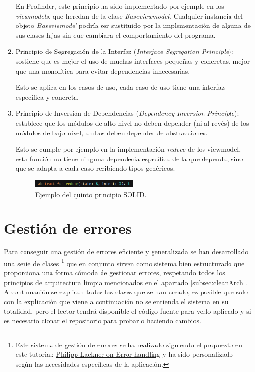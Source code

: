 \begin{enumerate}
    En Profinder, este principio ha sido implementado por ejemplo en los \textit{viewmodels}, que heredan de la clase \textit{Baseviewmodel}. Cualquier instancia del objeto \textit{Baseviemodel} podría ser sustituido por la implementación de alguna de sus clases hijas sin que cambiara el comportamiento del programa.
    \item Principio de Segregación de la Interfaz (\textit{Interface Segregation Principle}):  sostiene que es mejor el uso de muchas interfaces pequeñas y concretas, mejor que una monolítica para evitar dependencias innecesarias.
    
    Esto se aplica en los casos de uso, cada caso de uso tiene una interfaz específica y concreta.
    \item Principio de Inversión de Dependencias (\textit{Dependency Inversion Principle}): establece que los módulos de alto nivel no deben depender (ni al revés) de los módulos de bajo nivel, ambos deben depender de abstracciones.
    
    Esto se cumple por ejemplo en la implementación \textit{reduce} de los viewmodel, esta función no tiene ninguna dependecia específica de la que dependa, sino que se adapta a cada caso recibiendo tipos genéricos.
    \begin{figure}[h]
        \centering
        \includegraphics[width = 0.5\textwidth]{Imagenes/Fuentes/ejemplo_reduce.png}
        \caption{Ejemplo del quinto principio SOLID.}
        \label{fig:ejemplo_reduce}
    \end{figure}
\end{enumerate}

\section{Gestión de errores} 
Para conseguir una gestión de errores eficiente y generalizada se han desarrollado una serie de clases
\footnote{Este sistema de gestión de errores se ha realizado siguiendo el propuesto en este tutorial: \href{https://www.youtube.com/watch?v=MiLN2vs2Oe0}{Philipp Lackner on Error handling} y ha sido personalizado según las necesidades específicas de la aplicación.}
que en conjunto sirven como sistema bien estructurado que proporciona una forma cómoda de gestionar errores, respetando todos los principios de arquitectura limpia mencionados en el apartado \ref{subsec:cleanArch}. A continuación se explican todas las clases que se han creado, es posible que solo con la explicación que viene a continuación no se entienda el sistema en su totalidad, pero el lector tendrá disponible el código fuente para verlo aplicado y si es necesario clonar el repositorio para probarlo haciendo cambios.

